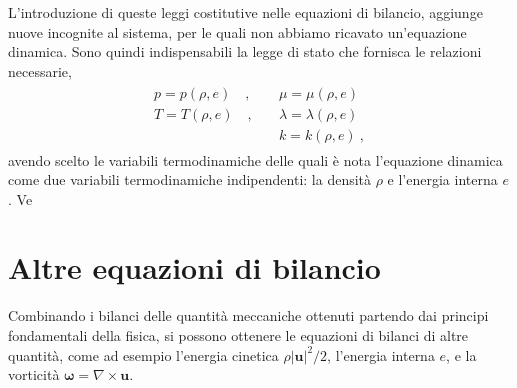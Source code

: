 \documentclass[letterpaper,10pt,italian]{jupyterBook}
\begin{document}
\sphinxAtStartPar
L’introduzione di queste leggi costitutive nelle equazioni di bilancio,
aggiunge nuove incognite al sistema, per le quali non abbiamo ricavato
un’equazione dinamica. Sono quindi indispensabili la legge di stato che
fornisca le relazioni necessarie,
\begin{equation*}
\begin{split}\begin{aligned}
  p = p(\rho,e) \quad , & \quad \mu = \mu(\rho,e) \\
  T = T(\rho,e) \quad , & \quad \lambda = \lambda(\rho,e) \\
  & \quad k = k(\rho,e) \ ,
 \end{aligned}\end{split}
\end{equation*}
\sphinxAtStartPar
avendo scelto le variabili termodinamiche delle quali è
nota l’equazione dinamica come due variabili termodinamiche
indipendenti: la densità \(\rho\) e l’energia interna \(e\). Ve


\section{Altre equazioni di bilancio}
\label{\detokenize{polimi/fluidmechanics-ita/template/capitoli/04_bilanci/04teoria:altre-equazioni-di-bilancio}}
\sphinxAtStartPar
Combinando i bilanci delle quantità meccaniche ottenuti partendo dai
principi fondamentali della fisica, si possono ottenere le equazioni di
bilanci di altre quantità, come ad esempio l’energia cinetica
\(\rho|\mathbf{u}|^2/2\), l’energia interna \(e\), e la vorticità
\(\mathbf{\omega} = \nabla \times \mathbf{u}\).
\end{document}
